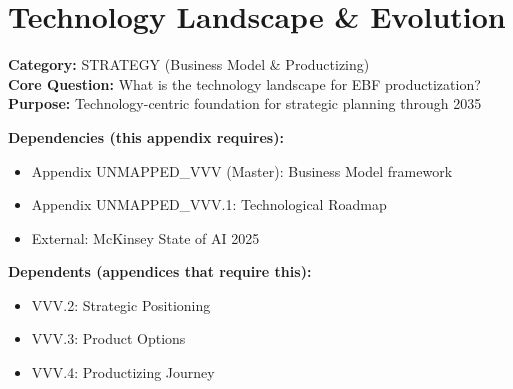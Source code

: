 \section{Technology Landscape \& Evolution}
\label{sec:vvv0-technology-landscape}


\begin{tcolorbox}[colback=gray!5!white, colframe=gray!75!black,
    title=\textbf{Appendix: VVV.0 STRATEGY-TECH}]

\textbf{Category:} STRATEGY (Business Model \& Productizing) \\
\textbf{Core Question:} What is the technology landscape for EBF productization? \\
\textbf{Purpose:} Technology-centric foundation for strategic planning through 2035

\end{tcolorbox}


\begin{tcolorbox}[colback=yellow!5!white, colframe=yellow!75!black,
    title=\textbf{Cross-Reference Map}]

\textbf{Dependencies (this appendix requires):}
\begin{itemize}[nosep]
    \item Appendix UNMAPPED_VVV (Master): Business Model framework
    \item Appendix UNMAPPED_VVV.1: Technological Roadmap
    \item External: McKinsey State of AI 2025
\end{itemize}

\textbf{Dependents (appendices that require this):}
\begin{itemize}[nosep]
    \item VVV.2: Strategic Positioning
    \item VVV.3: Product Options
    \item VVV.4: Productizing Journey
\end{itemize}

\end{tcolorbox}

